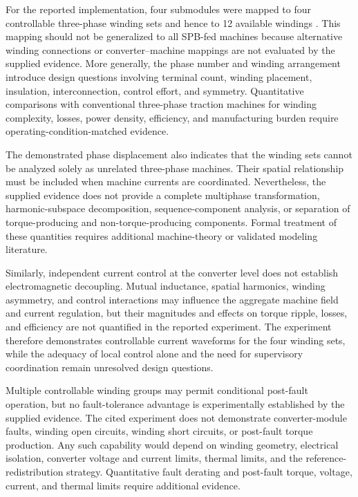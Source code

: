 For the reported implementation, four submodules were mapped to four controllable three-phase winding sets and hence to 12 available windings \cite{Jin2017}. This mapping should not be generalized to all SPB-fed machines because alternative winding connections or converter--machine mappings are not evaluated by the supplied evidence. More generally, the phase number and winding arrangement introduce design questions involving terminal count, winding placement, insulation, interconnection, control effort, and symmetry. Quantitative comparisons with conventional three-phase traction machines for winding complexity, losses, power density, efficiency, and manufacturing burden require operating-condition-matched evidence. %

The demonstrated phase displacement also indicates that the winding sets cannot be analyzed solely as unrelated three-phase machines. Their spatial relationship must be included when machine currents are coordinated. Nevertheless, the supplied evidence does not provide a complete multiphase transformation, harmonic-subspace decomposition, sequence-component analysis, or separation of torque-producing and non-torque-producing components. Formal treatment of these quantities requires additional machine-theory or validated modeling literature. %

Similarly, independent current control at the converter level does not establish electromagnetic decoupling. Mutual inductance, spatial harmonics, winding asymmetry, and control interactions may influence the aggregate machine field and current regulation, but their magnitudes and effects on torque ripple, losses, and efficiency are not quantified in the reported experiment. The experiment therefore demonstrates controllable current waveforms for the four winding sets, while the adequacy of local control alone and the need for supervisory coordination remain unresolved design questions. %

Multiple controllable winding groups may permit conditional post-fault operation, but no fault-tolerance advantage is experimentally established by the supplied evidence. The cited experiment does not demonstrate converter-module faults, winding open circuits, winding short circuits, or post-fault torque production. Any such capability would depend on winding geometry, electrical isolation, converter voltage and current limits, thermal limits, and the reference-redistribution strategy. Quantitative fault derating and post-fault torque, voltage, current, and thermal limits require additional evidence. %

